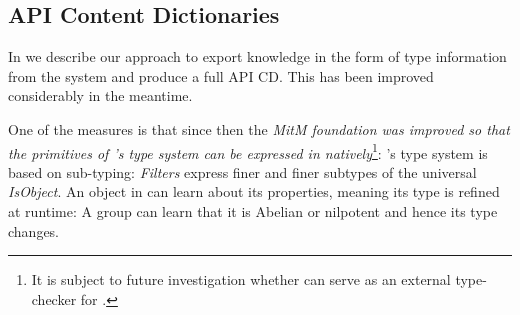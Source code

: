 

\subsection{\GAP API Content Dictionaries}

In \cite{DehKohKon:iop16} we describe our approach to export knowledge in the form of type
information from the \GAP system and produce a full \GAP API CD. This has been
improved considerably in the meantime. 

One of the measures is that since then the \emph{MitM foundation was improved so that the
  primitives of \GAP's type system can be expressed in \OMMT natively}\footnote{It is
  subject to future investigation whether \MMT can serve as an external type-checker for
  \GAP.}: \GAP's type system is based on sub-typing: \emph{Filters} express finer and
finer subtypes of the universal \emph{IsObject}. An object in \GAP can learn about its
properties, meaning its type is refined at runtime: A group can learn that it is Abelian
or nilpotent and hence its type changes.

